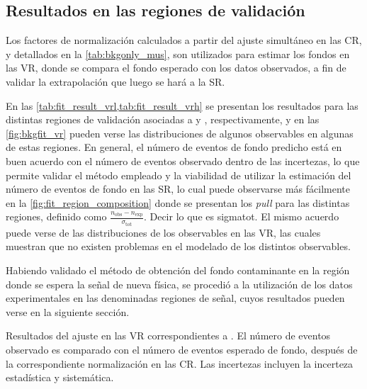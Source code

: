 \subsection{Resultados en las regiones de validación}

Los factores de normalización calculados a partir del ajuste simultáneo en las
CR, y detallados en la \cref{tab:bkgonly_mus}, son utilizados para estimar los fondos
en las VR, donde se compara el fondo esperado con los datos observados, a fin de
validar la extrapolación que luego se hará a la SR.

En las \cref{tab:fit_result_vrl,tab:fit_result_vrh} se presentan los resultados
para las distintas regiones de validación asociadas a {\SRL} y {\SRH},
respectivamente, y en las \cref{fig:bkgfit_vr} pueden verse las distribuciones
de algunos observables en algunas de estas regiones. En general, el número de
eventos de fondo predicho está en buen acuerdo con el número de eventos
observado dentro de las incertezas, lo que permite validar el método empleado y
la viabilidad de utilizar la estimación del número de eventos de fondo en las
SR, lo cual puede observarse más fácilmente en la
\cref{fig:fit_region_composition} donde se presentan los \emph{pull} para las
distintas regiones, definido como $\frac{n_\text{obs} - n_\text{exp}}{\sigma_\text{tot}}$.
Decir lo que es sigmatot.
El mismo acuerdo puede verse de las distribuciones de los
observables en las VR, las cuales muestran que no existen problemas en el
modelado de los distintos observables.

Habiendo validado el método de obtención del fondo contaminante en la región
donde se espera la señal de nueva física, se procedió a la utilización de los
datos experimentales en las denominadas regiones de señal, cuyos resultados
pueden verse en la siguiente sección.


\begin{table}[!htb]

  \caption{Resultados del ajuste en las VR correspondientes a {\SRL}.
    El número de eventos observado es comparado con el número de eventos
    esperado de fondo, después de la correspondiente normalización en las CR.
    Las incertezas incluyen la incerteza estadística y sistemática.}
  \label{tab:fit_result_vrl}

  

  \bigskip

  

\end{table}


